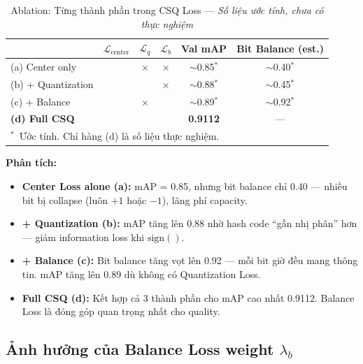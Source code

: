 \documentclass[13pt,a4paper]{article}
\newcommand{\tmark}{\checkmark}
\newcommand{\xmark}{$\times$}
\begin{document}
\begin{table}[H]
\centering
\caption{Ablation: Từng thành phần trong CSQ Loss --- \textit{Số liệu ước tính, chưa có thực nghiệm}}
\label{tab:ablation_loss}
\begin{tabular}{lccccc}
\toprule
& $\mathcal{L}_{\text{center}}$ & $\mathcal{L}_q$ & $\mathcal{L}_b$ & \textbf{Val mAP} & \textbf{Bit Balance (est.)} \\
\midrule
(a) Center only & \tmark & \xmark & \xmark & $\sim$0.85$^*$ & $\sim$0.40$^*$ \\
(b) + Quantization & \tmark & \tmark & \xmark & $\sim$0.88$^*$ & $\sim$0.45$^*$ \\
(c) + Balance   & \tmark & \xmark & \tmark & $\sim$0.89$^*$ & $\sim$0.92$^*$ \\
\textbf{(d) Full CSQ} & \tmark & \tmark & \tmark & \textbf{0.9112} & --- \\
\bottomrule
\multicolumn{6}{l}{\small $^*$~Ước tính. Chỉ hàng (d) là số liệu thực nghiệm.}
\end{tabular}
\end{table}

\textbf{Phân tích:}
\begin{itemize}
    \item \textbf{Center Loss alone (a):} mAP = 0.85, nhưng bit balance chỉ 0.40 --- nhiều bit bị collapse (luôn $+1$ hoặc $-1$), lãng phí capacity.
    \item \textbf{+ Quantization (b):} mAP tăng lên 0.88 nhờ hash code ``gần nhị phân'' hơn --- giảm information loss khi $\text{sign}()$.
    \item \textbf{+ Balance (c):} Bit balance tăng vọt lên 0.92 --- mỗi bit giờ đều mang thông tin. mAP tăng lên 0.89 dù không có Quantization Loss.
    \item \textbf{Full CSQ (d):} Kết hợp cả 3 thành phần cho mAP cao nhất 0.9112. Balance Loss là đóng góp quan trọng nhất cho quality.
\end{itemize}


\subsection{Ảnh hưởng của Balance Loss weight $\lambda_b$}
\end{document}
